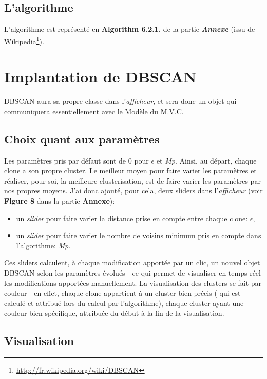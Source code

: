 \documentclass[12pt]{report}
\begin{document}
\begin{spacing}{1.2}
\subsection{L'algorithme}

L'algorithme est représenté en \textbf{Algorithm 6.2.1.} de la partie \textbf{\textit{Annexe}} (issu de Wikipedia\footnote{\url{http://fr.wikipedia.org/wiki/DBSCAN}}).

\section{Implantation de DBSCAN}

DBSCAN aura sa propre classe dans l'\textit{afficheur}, et sera donc un objet qui communiquera essentiellement avec le Modèle du M.V.C.

\subsection{Choix quant aux paramètres}

Les paramètres pris par défaut sont de 0 pour $\epsilon$ et \textit{Mp}. Ainsi, au départ, chaque clone a son propre cluster.
\newline
Le meilleur moyen pour faire varier les paramètres et réaliser, pour soi, la meilleure clusterisation, est de faire varier les paramètres par nos propres moyens.
\newline
J'ai donc ajouté, pour cela, deux sliders dans l'\textit{afficheur} (voir \textbf{Figure 8} dans la partie \textbf{Annexe}):
	\begin{itemize}
	\item{un \textit{slider} pour faire varier la distance prise en compte entre chaque clone: $\epsilon$,}
	\item{un \textit{slider} pour faire varier le nombre de voisins minimum pris en compte dans l'algorithme: \textit{Mp}.}
	\end{itemize}
Ces sliders calculent, à chaque modification apportée par un clic, un nouvel objet DBSCAN selon les paramètres évolués - ce qui permet de visualiser en temps réel les modifications apportées manuellement.
\newline
La visualisation des clusters se fait par couleur - en effet, chaque clone appartient à un cluster bien précis ( qui est calculé et attribué lors du calcul par l'algorithme), chaque cluster ayant une couleur bien spécifique, attribuée du début à la fin de la visualisation.

\subsection{Visualisation}


\end{spacing}
\end{document}
